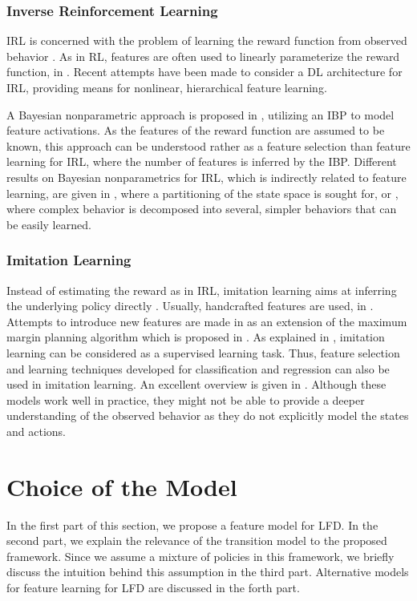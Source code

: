 \documentclass{article}
\begin{document}
\subsubsection{Inverse Reinforcement Learning}
\ac{IRL} is concerned with the problem of learning the reward function from observed behavior \cite{Ng2000}. 
As in \ac{RL}, features are often used to linearly parameterize the reward function, \eg in \cite{Ng2000, Hahn2015}. 
Recent attempts have been made to consider a \ac{DL} architecture \cite{Wulfmeier2015} for \ac{IRL}, providing means for nonlinear, hierarchical feature learning.

A Bayesian nonparametric approach is proposed in \cite{Choi2012}, utilizing an \ac{IBP} to model feature activations. 
As the features of the reward function are assumed to be known, this approach can be understood rather as a feature selection than feature learning for \ac{IRL}, where the number of features is inferred by the \ac{IBP}. 
Different results on Bayesian nonparametrics for \ac{IRL}, which is indirectly related to feature learning, are given in \cite{Michini2012}, where a partitioning of the state space is sought for, or \cite{Surana2014}, where complex behavior is decomposed into several, simpler behaviors that can be easily learned.

\subsubsection{Imitation Learning}
Instead of estimating the reward as in \ac{IRL}, imitation learning aims at inferring the underlying policy directly \cite{Atkeson1997, Sosic2016a}.
Usually, handcrafted features are used, \eg in \cite{Ratliff2006, Ross2011}. 
Attempts to introduce new features are made in \cite{Ratliff2007} as an extension of the maximum margin planning algorithm which is proposed in \cite{Ratliff2006}.
As explained in \cite{Argall2009}, imitation learning can be considered as a supervised learning task. 
Thus, feature selection and learning techniques developed for classification and regression can also be used in imitation learning. 
An excellent overview is given in \cite{Guyon2003}.
Although these models work well in practice, they might not be able to provide a deeper understanding of the observed behavior as they do not explicitly model the states and actions.

\section{Choice of the Model}
\label{sec::model}
In the first part of this section, we propose a feature model for \ac{LFD}. In the second part, we explain the relevance of the transition model to the proposed framework. Since we assume a mixture of policies in this framework, we briefly discuss the intuition behind this assumption in the third part. Alternative models for feature learning for \ac{LFD} are discussed in the forth part.
\end{document}
